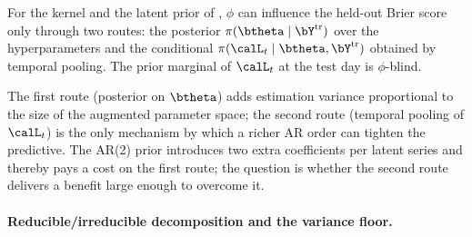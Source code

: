 \begin{proposition}\label{prop:phi-route}
For the kernel  and the latent prior of , $\phi$ can influence the held-out Brier score  only through two routes: the posterior $\pi(\btheta \mid \bY^{\mathrm{tr}})$ over the hyperparameters and the conditional $\pi(\calL_t \mid \btheta, \bY^{\mathrm{tr}})$ obtained by temporal pooling.  The prior marginal of $\calL_t$ at the test day is $\phi$-blind.
\end{proposition}

The first route (posterior on $\btheta$) adds estimation variance proportional to the size of the augmented parameter space; the second route (temporal pooling of $\calL_t$) is the only mechanism by which a richer AR order can tighten the predictive.  The AR(2) prior introduces two extra coefficients per latent series and thereby pays a cost on the first route; the question is whether the second route delivers a benefit large enough to overcome it.

\paragraph{Reducible/irreducible decomposition and the variance floor.}

